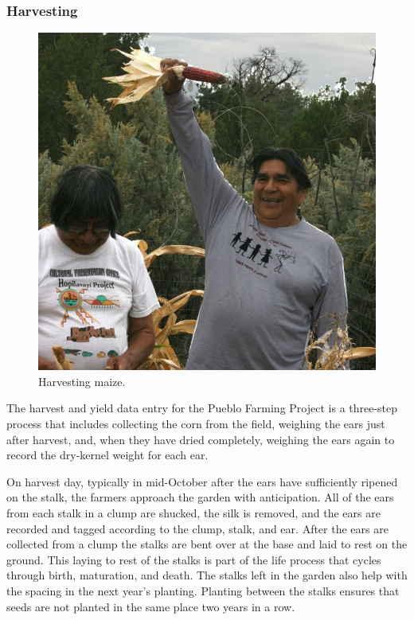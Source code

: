 \documentclass[12pt,]{article}
\begin{document}
\hypertarget{harvesting}{%
\subsubsection*{Harvesting}\label{harvesting}}

\begin{figure}
\centering
\includegraphics{./images/chapter_5_harvest.jpg}
\caption{Harvesting maize.}
\end{figure}

The harvest and yield data entry for the Pueblo Farming Project is a three-step process that includes collecting the corn from the field, weighing the ears just after harvest, and, when they have dried completely, weighing the ears again to record the dry-kernel weight for each ear.

On harvest day, typically in mid-October after the ears have sufficiently ripened on the stalk, the farmers approach the garden with anticipation. All of the ears from each stalk in a clump are shucked, the silk is removed, and the ears are recorded and tagged according to the clump, stalk, and ear. After the ears are collected from a clump the stalks are bent over at the base and laid to rest on the ground. This laying to rest of the stalks is part of the life process that cycles through birth, maturation, and death. The stalks left in the garden also help with the spacing in the next year's planting. Planting between the stalks ensures that seeds are not planted in the same place two years in a row.
\end{document}
